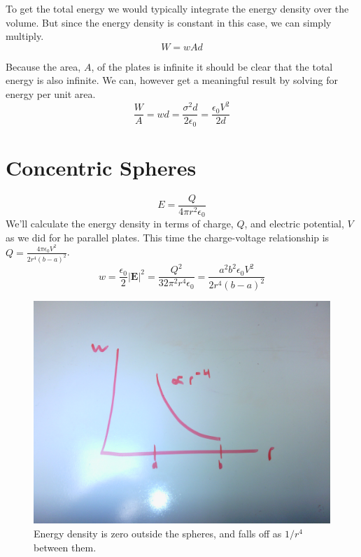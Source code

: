 \documentclass[10pt,a4paper]{article}
\begin{document}
To get the total energy we would typically integrate the energy density over the volume. But since the energy density is constant in this case, we can simply multiply.
\begin{equation}
W=wAd
\end{equation}

Because the area, $A$, of the plates is infinite it should be clear that the total energy is also infinite. We can, however get a meaningful result by solving for energy per unit area.
\begin{equation}
\frac{W}{A}=wd=\frac{\sigma^2d}{2\epsilon_0}=\frac{\epsilon_0 V^2}{2d}
\end{equation}

\section{Concentric Spheres}
\begin{equation}
E=\frac{Q}{4\pi r^2\epsilon_0}
\end{equation}
We'll calculate the energy density in terms of charge, $Q$, and electric potential, $V$ as we did for he parallel plates. This time the charge-voltage relationship is $Q=\frac{4\pi\epsilon_0 V^2}{2r^4(b-a)^2}$.
\begin{equation}\label{w-sphere}
w=\frac{\epsilon_0}{2}|\mathbf{E}|^2=\frac{Q^2}{32\pi^2r^4\epsilon_0}=\frac{a^2b^2\epsilon_0V^2}{2r^4(b-a)^2}
\end{equation}

\begin{figure}[h]
\centering
\includegraphics[scale=.1]{Jackson1-8-sphere.jpg}
\caption{Energy density is zero outside the spheres, and falls off as $1/r^4$ between them.}
\end{figure}
\end{document}
